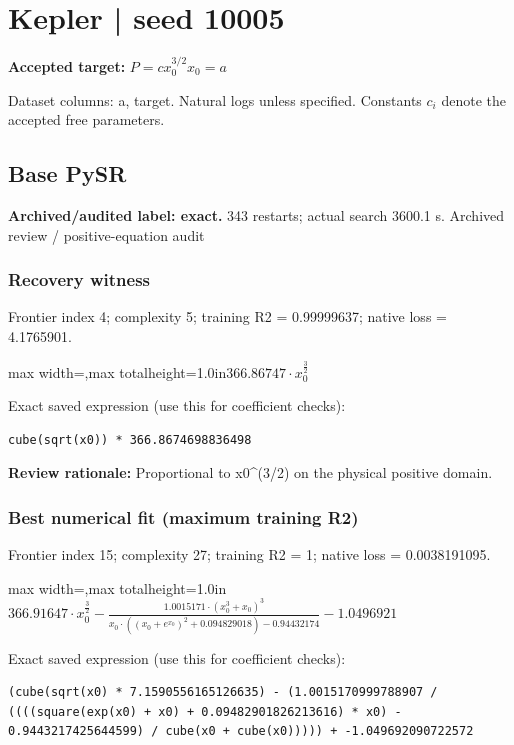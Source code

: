 \documentclass[10pt,letterpaper,landscape]{article}
\begin{document}
\section*{Kepler | seed 10005}
\textbf{Accepted target:} $\displaystyle P=c x_0^{3/2}$\hfill $x_0=a$\par
{\small Dataset columns: a, target. Natural logs unless specified. Constants $c_i$ denote the accepted free parameters.}\par\medskip
\begin{minipage}[t]{0.485\textwidth}
\subsection*{Base PySR}
\textbf{Archived/audited label: exact.} 343 restarts; actual search 3600.1 s.
{\small Archived review / positive-equation audit}
\subsubsection*{Recovery witness}
Frontier index 4; complexity 5; training R2 = 0.99999637; native loss = 4.1765901.
\begin{center}\begin{adjustbox}{max width=\linewidth,max totalheight=1.0in}$\displaystyle 366.86747 \cdot x_{0}^{\frac{3}{2}}$\end{adjustbox}\end{center}
{\scriptsize Exact saved expression (use this for coefficient checks):}
\begin{lstlisting}
cube(sqrt(x0)) * 366.8674698836498
\end{lstlisting}
{\small\textbf{Review rationale:} Proportional to x0\textasciicircum{}(3/2) on the physical positive domain.}
\subsubsection*{Best numerical fit (maximum training R2)}
Frontier index 15; complexity 27; training R2 = 1; native loss = 0.0038191095.
\begin{center}\begin{adjustbox}{max width=\linewidth,max totalheight=1.0in}$\displaystyle 366.91647 \cdot x_{0}^{\frac{3}{2}} - \frac{1.0015171 \cdot \left(x_{0}^{3} + x_{0}\right)^{3}}{x_{0} \cdot \left(\left(x_{0} + e^{x_{0}}\right)^{2} + 0.094829018\right) - 0.94432174} - 1.0496921$\end{adjustbox}\end{center}
{\scriptsize Exact saved expression (use this for coefficient checks):}
\begin{lstlisting}
(cube(sqrt(x0) * 7.1590556165126635) - (1.0015170999788907 / ((((square(exp(x0) + x0) + 0.09482901826213616) * x0) - 0.9443217425644599) / cube(x0 + cube(x0))))) + -1.049692090722572
\end{lstlisting}
\end{minipage}\hfill
\end{document}
